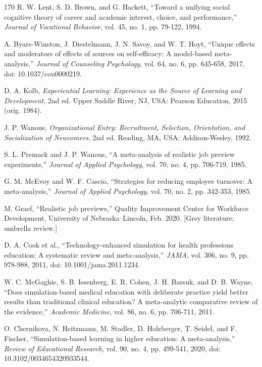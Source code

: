 \begin{thebibliography}{170}
 R. W. Lent, S. D. Brown, and G. Hackett, ``Toward a unifying social cognitive theory of career and academic interest, choice, and performance,'' \textit{Journal of Vocational Behavior}, vol. 45, no. 1, pp. 79-122, 1994.

 A. Byars-Winston, J. Diestelmann, J. N. Savoy, and W. T. Hoyt, ``Unique effects and moderators of effects of sources on self-efficacy: A model-based meta-analysis,'' \textit{Journal of Counseling Psychology}, vol. 64, no. 6, pp. 645-658, 2017, doi: 10.1037/cou0000219.

 D. A. Kolb, \textit{Experiential Learning: Experience as the Source of Learning and Development}, 2nd ed. Upper Saddle River, NJ, USA: Pearson Education, 2015 (orig. 1984).

 J. P. Wanous, \textit{Organizational Entry: Recruitment, Selection, Orientation, and Socialization of Newcomers}, 2nd ed. Reading, MA, USA: Addison-Wesley, 1992.

 S. L. Premack and J. P. Wanous, ``A meta-analysis of realistic job preview experiments,'' \textit{Journal of Applied Psychology}, vol. 70, no. 4, pp. 706-719, 1985.

 G. M. McEvoy and W. F. Cascio, ``Strategies for reducing employee turnover: A meta-analysis,'' \textit{Journal of Applied Psychology}, vol. 70, no. 2, pp. 342-353, 1985.

 M. Graef, ``Realistic job previews,'' Quality Improvement Center for Workforce Development, University of Nebraska--Lincoln, Feb. 2020. [Grey literature; umbrella review.]

 D. A. Cook et al., ``Technology-enhanced simulation for health professions education: A systematic review and meta-analysis,'' \textit{JAMA}, vol. 306, no. 9, pp. 978-988, 2011, doi: 10.1001/jama.2011.1234.

 W. C. McGaghie, S. B. Issenberg, E. R. Cohen, J. H. Barsuk, and D. B. Wayne, ``Does simulation-based medical education with deliberate practice yield better results than traditional clinical education? A meta-analytic comparative review of the evidence,'' \textit{Academic Medicine}, vol. 86, no. 6, pp. 706-711, 2011.

 O. Chernikova, N. Heitzmann, M. Stadler, D. Holzberger, T. Seidel, and F. Fischer, ``Simulation-based learning in higher education: A meta-analysis,'' \textit{Review of Educational Research}, vol. 90, no. 4, pp. 499-541, 2020, doi: 10.3102/0034654320933544.


\end{thebibliography}
